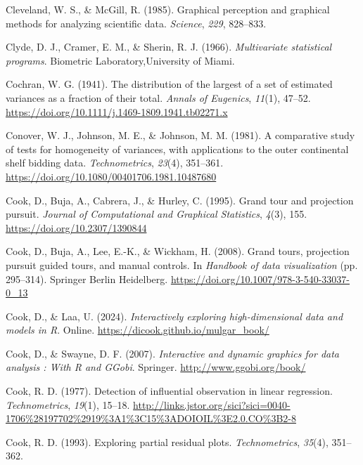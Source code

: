 \documentclass[
  letterpaper,
  10pt,
  krantz2]{krantz}
\newlength{\cslhangindent}
\newenvironment{CSLReferences}[2] %
 {\begin{list}{}{%
  \setlength{\itemindent}{0pt}
  \setlength{\leftmargin}{0pt}
  \setlength{\parsep}{0pt}
  \ifodd #1
   \setlength{\leftmargin}{\cslhangindent}
   \setlength{\itemindent}{-1\cslhangindent}
  \fi
  \setlength{\itemsep}{#2\baselineskip}}}
 {\end{list}}
\begin{document}
\begin{CSLReferences}{1}{0}
Cleveland, W. S., \& McGill, R. (1985). Graphical perception and
graphical methods for analyzing scientific data. \emph{Science},
\emph{229}, 828--833.

Clyde, D. J., Cramer, E. M., \& Sherin, R. J. (1966). \emph{Multivariate
statistical programs}. Biometric Laboratory,University of Miami.

Cochran, W. G. (1941). The distribution of the largest of a set of
estimated variances as a fraction of their total. \emph{Annals of
Eugenics}, \emph{11}(1), 47--52.
\url{https://doi.org/10.1111/j.1469-1809.1941.tb02271.x}

Conover, W. J., Johnson, M. E., \& Johnson, M. M. (1981). A comparative
study of tests for homogeneity of variances, with applications to the
outer continental shelf bidding data. \emph{Technometrics},
\emph{23}(4), 351--361.
\url{https://doi.org/10.1080/00401706.1981.10487680}

Cook, D., Buja, A., Cabrera, J., \& Hurley, C. (1995). Grand tour and
projection pursuit. \emph{Journal of Computational and Graphical
Statistics}, \emph{4}(3), 155. \url{https://doi.org/10.2307/1390844}

Cook, D., Buja, A., Lee, E.-K., \& Wickham, H. (2008). Grand tours,
projection pursuit guided tours, and manual controls. In \emph{Handbook
of data visualization} (pp. 295--314). Springer Berlin Heidelberg.
\url{https://doi.org/10.1007/978-3-540-33037-0_13}

Cook, D., \& Laa, U. (2024). \emph{Interactively exploring
high-dimensional data and models in {R}}. Online.
\url{https://dicook.github.io/mulgar_book/}

Cook, D., \& Swayne, D. F. (2007). \emph{Interactive and dynamic
graphics for data analysis : With {R} and {GGobi}}. Springer.
\url{http://www.ggobi.org/book/}

Cook, R. D. (1977). Detection of influential observation in linear
regression. \emph{Technometrics}, \emph{19}(1), 15--18.
\url{http://links.jstor.org/sici?sici=0040-1706\%28197702\%2919\%3A1\%3C15\%3ADOIOIL\%3E2.0.CO\%3B2-8}

Cook, R. D. (1993). Exploring partial residual plots.
\emph{Technometrics}, \emph{35}(4), 351--362.


\end{CSLReferences}
\end{document}
